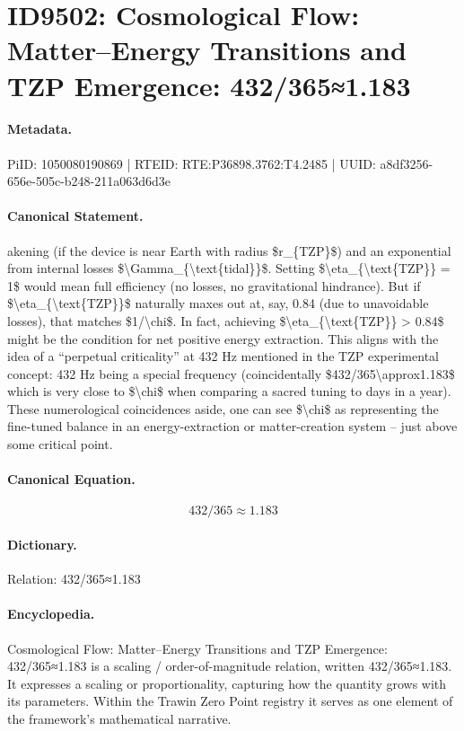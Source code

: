 \section*{ID9502: Cosmological Flow: Matter–Energy Transitions and TZP Emergence: 432/365≈1.183}
\paragraph{Metadata.}
PiID: 1050080190869 | RTEID: RTE:P36898.3762:T4.2485 | UUID: a8df3256-656e-505c-b248-211a063d6d3e

\paragraph{Canonical Statement.}
akening (if the device is near Earth with radius \$r\_\{TZP\}\$) and an exponential from internal losses \$\textbackslash{}Gamma\_\{\textbackslash{}text\{tidal\}\}\$. Setting \$\textbackslash{}eta\_\{\textbackslash{}text\{TZP\}\} = 1\$ would mean full efficiency (no losses, no gravitational hindrance). But if \$\textbackslash{}eta\_\{\textbackslash{}text\{TZP\}\}\$ naturally maxes out at, say, 0.84 (due to unavoidable losses), that matches \$1/\textbackslash{}chi\$. In fact, achieving \$\textbackslash{}eta\_\{\textbackslash{}text\{TZP\}\} > 0.84\$ might be the condition for net positive energy extraction. This aligns with the idea of a “perpetual criticality” at 432 Hz mentioned in the TZP experimental concept: 432 Hz being a special frequency (coincidentally \$432/365\textbackslash{}approx1.183\$ which is very close to \$\textbackslash{}chi\$ when comparing a sacred tuning to days in a year). These numerological coincidences aside, one can see \$\textbackslash{}chi\$ as representing the fine-tuned balance in an energy-extraction or matter-creation system – just above some critical point.

\paragraph{Canonical Equation.}
\[
432/365\approx1.183
\]

\paragraph{Dictionary.}
Relation: 432/365≈1.183

\paragraph{Encyclopedia.}
Cosmological Flow: Matter–Energy Transitions and TZP Emergence: 432/365≈1.183 is a scaling / order-of-magnitude relation, written 432/365≈1.183. It expresses a scaling or proportionality, capturing how the quantity grows with its parameters. Within the Trawin Zero Point registry it serves as one element of the framework's mathematical narrative.
